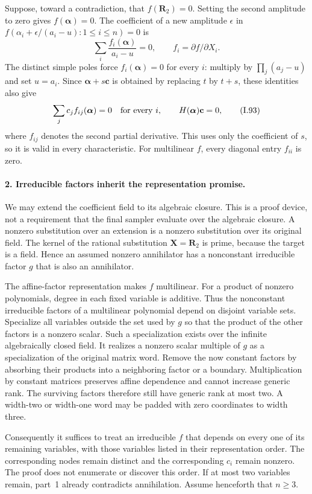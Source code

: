Suppose, toward a contradiction, that $f(\mathbf R_2)=0$. Setting
the second amplitude to zero gives $f(\boldsymbol\alpha)=0$.
The coefficient of a new amplitude $\epsilon$ in
$f(\alpha_i+\epsilon/(a_i-u):1\le i\le n)=0$ is
\[
 \sum_i\frac{f_i(\boldsymbol\alpha)}{a_i-u}=0,
 \qquad f_i=\partial f/\partial X_i.
\]
The distinct simple poles force $f_i(\boldsymbol\alpha)=0$ for
every $i$: multiply by $\prod_j(a_j-u)$ and set $u=a_i$.
Since $\boldsymbol\alpha+s\mathbf c$ is obtained by replacing
$t$ by $t+s$, these identities also give
\[
 \sum_j c_j f_{ij}(\boldsymbol\alpha)=0
 \quad\hbox{for every }i,
 \qquad H(\boldsymbol\alpha)\mathbf c=0,
 \tag{I.93}
\]
where $f_{ij}$ denotes the second partial derivative. This uses
only the coefficient of $s$, so it is valid in every characteristic.
For multilinear $f$, every diagonal entry $f_{ii}$ is zero.

\paragraph{2. Irreducible factors inherit the representation promise.}
We may extend the coefficient field to its algebraic closure.
This is a proof device, not a requirement that the final sampler
evaluate over the algebraic closure. A nonzero substitution over
an extension is a nonzero substitution over its original field.
The kernel of the rational substitution $\mathbf X=\mathbf R_2$
is prime, because the target is a field. Hence an assumed nonzero
annihilator has a nonconstant irreducible factor $g$ that is also
an annihilator.

The affine-factor representation makes $f$ multilinear. For a
product of nonzero polynomials, degree in each fixed variable is
additive. Thus the nonconstant irreducible factors of a multilinear
polynomial depend on disjoint variable sets. Specialize all
variables outside the set used by $g$ so that the product of the
other factors is a nonzero scalar. Such a specialization exists
over the infinite algebraically closed field. It realizes a
nonzero scalar multiple of $g$ as a specialization of the original
matrix word. Remove the now constant factors by absorbing their
products into a neighboring factor or a boundary. Multiplication
by constant matrices preserves affine dependence and cannot
increase generic rank. The surviving factors therefore still
have generic rank at most two. A width-two or width-one word may
be padded with zero coordinates to width three.

Consequently it suffices to treat an irreducible $f$ that depends
on every one of its remaining variables, with those variables
listed in their representation order. The corresponding nodes
remain distinct and the corresponding $c_i$ remain nonzero.
The proof does not enumerate or discover this order. If at most
two variables remain, part~1 already contradicts annihilation.
Assume henceforth that $n\ge3$.

